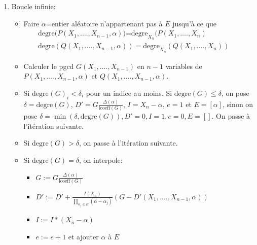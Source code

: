 \documentclass[a4paper,11pt]{article}
\begin{document}
\begin{giacjshere}
\begin{enumerate}
  \item Boucle infinie:
  \begin{itemize}
    \item Faire $\alpha$=entier aléatoire n'appartenant pas à $E$ jusqu'à ce
    que
    \begin{eqnarray*}
      \text{degre($P ( X_1, \ldots ., X_{n - 1}, \alpha
      ))$=$\mbox{degre}_{X_n} ( P ( X_1, \ldots ., X_n )$} &  & \\
      \mbox{degre} ( Q ( X_1, \ldots ., X_{n - 1}, \alpha )) =
      \mbox{degre}_{X_n} ( Q ( X_1, \ldots ., X_n )) &  & 
    \end{eqnarray*}
    \item Calculer le pgcd $G ( X_1, \ldots ., X_{n - 1} )$ en $n - 1$
    variables de $P ( X_1, \ldots ., X_{n - 1}, \alpha )$ et $Q ( X_1, \ldots
    ., X_{n - 1}, \alpha )$.
    
    \item Si $\mbox{degre}_{} ( G )_i < \delta_i$ pour un indice au moins.
    Si $\mbox{degre} ( G ) \leqslant \delta$, on pose $\delta =
    \mbox{degre} ( G )$, $D' = G \frac{\Delta ( \alpha )}{\mbox{lcoeff} ( G
    )}$, $I = X_n - \alpha$, $e = 1$ et $E = [ \alpha ]$, sinon on pose $\delta
    = \min ( \delta, \mbox{degre} ( G )), D' = 0, I = 1, e = 0, E = [ ]$.
    On passe à l'itération suivante.

    \item Si $\mbox{degre} ( G ) > \delta$, on passe à l'itération suivante.
    
    \item Si $\mbox{degre} ( G ) = \delta$, on interpole:
    \begin{itemize}
      \item $G := G \frac{\Delta ( \alpha )}{\mbox{lcoeff} ( G )}$
      
      \item $D' := D' + \frac{I ( X_n )}{\prod_{\alpha_j \in E} ( \alpha -
      \alpha_j )} ( G - D' ( X_1, \ldots ., X_{n - 1}, \alpha ))$
      
      \item $I := I \ast ( X_n - \alpha )$
      
      \item $e := e + 1$ et ajouter $\alpha$ à $E$
      

\end{itemize}
\end{itemize}
\end{enumerate}
\end{giacjshere}
\end{document}
